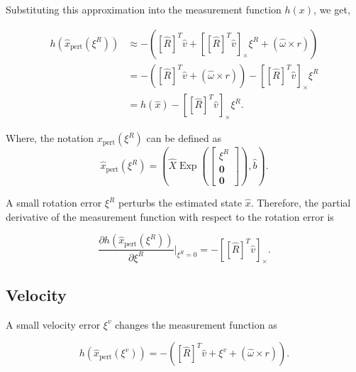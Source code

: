 \documentclass[report.tex]{subfiles}
\begin{document}
    Substituting this approximation into the measurement function $h(x)$, we get,

    \begin{align}
        h(\hat x_{\mathrm{pert}}(\xi^R))
        &\approx
        -\left(
        [\hat R]^{T}\hat v + \left[ [\hat R]^{T}\hat v \right]_{\times}\xi^R +
        \left(
        \hat \omega\times r
        \right)
        \right)
        \\
        &=
        -\left(
        [\hat R]^{T}\hat v
        +
        \left(
        \hat \omega\times r
        \right)
        \right)
        -
        \left[
        [\hat R]^{T}\hat v
        \right]_{\times}\xi^R
        \\
        &=
        h(\hat x)
        -
        \left[
        [\hat R]^{T}\hat v
        \right]_{\times}\xi^R.
    \end{align}

    Where, the notation  $x_{\mathrm{pert}}(\xi^R)$ can be defined as 
    \begin{equation}
        \hat x_{\mathrm{pert}}(\xi^R)
        =
        \left(
            \hat{X}
            \operatorname{Exp}
            \left(
                \begin{bmatrix}
                    \xi^R \\
                    \mathbf{0} \\
                    \mathbf{0}
                \end{bmatrix}
            \right),
            \hat{b}
        \right).
        \label{eq:rotationPerturbedState}
    \end{equation}

    A small rotation error $\xi^R$ perturbs the estimated state $\hat x$. Therefore, the partial derivative of the measurement function with respect to the rotation error is
    
    \begin{equation}
    \frac{\partial h(\hat x_{\mathrm{pert}}(\xi^R))}
    {\partial \xi^R}
    \bigg|_{\xi^R=0}
    =
    -\left[
    [\hat R]^{T}\hat v
    \right]_{\times}.
    \end{equation} 
    
    \subsection{Velocity}
    A small velocity error $\xi^v$ changes the measurement function as

    \begin{equation}
        h(\hat x_{\mathrm{pert}}(\xi^v))
        =
        -\left(
        [\hat R]^{T}\hat v
        +
        \xi^v
        +
        \left(
        \hat \omega\times r
        \right)
        \right).
        \label{eq:velocityperturb}
    \end{equation}
   
\end{document}

